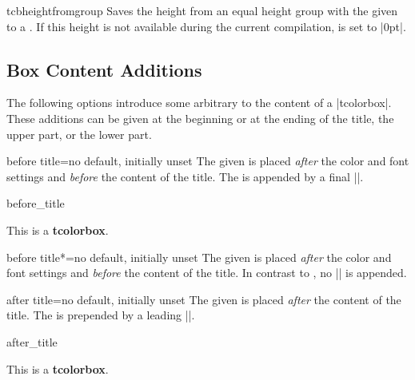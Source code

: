 \begin{docCommand}[doc new=2015-11-27]{tcbheightfromgroup}{}
  Saves the height from an equal height group with the given 
  to a . If this height is not available during the current compilation,
   is set to |0pt|.
\end{docCommand}


\clearpage
\subsection{Box Content Additions}\label{subsec:contentadditions}
The following options introduce some arbitrary  to the content
of a |tcolorbox|. These additions can be given at the beginning or at the ending
of the title, the upper part, or the lower part.

\begin{docTcbKey}[][doc updated=2023-01-27]{before title}{=}{no default, initially unset}
  The given  is placed \emph{after} the color and font settings
  and \emph{before} the content of the title.
  The  is appended by a final |\ignorespaces|.
\begin{exdispExample}{before_title}

\begin{tcolorbox}[title=My title]
This is a \textbf{tcolorbox}.
\end{tcolorbox}
\end{exdispExample}
\end{docTcbKey}


\begin{docTcbKey}[][doc new=2023-01-27]{before title*}{=}{no default, initially unset}
  The given  is placed \emph{after} the color and font settings
  and \emph{before} the content of the title.
  In contrast to , no |\ignorespaces| is appended.
\end{docTcbKey}


\begin{docTcbKey}[][doc updated=2023-01-27]{after title}{=}{no default, initially unset}
  The given  is placed \emph{after} the content of the title.
  The  is prepended by a leading |\unskip|.
\begin{exdispExample}{after_title}

\begin{tcolorbox}[title=My title]
This is a \textbf{tcolorbox}.
\end{tcolorbox}
\end{exdispExample}
\end{docTcbKey}


